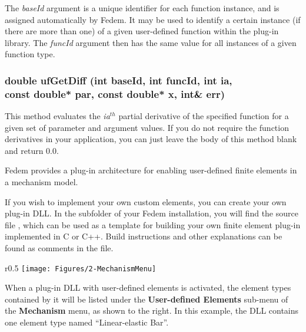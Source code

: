 The {\sl baseId} argument is a unique identifier for each function instance,
and is assigned automatically by Fedem. It may be used to identify a certain
instance (if there are more than one) of a given user-defined function within
the plug-in library. The {\sl funcId} argument then has the same value for all
instances of a given function type.

\subsubsection{double ufGetDiff (int baseId, int funcId, int ia, \\
  const double* par, const double* x, int\& err)}

This method evaluates the {\sl ia}$^{th}$ partial derivative of the specified
function for a given set of parameter and argument values.
If you do not require the function derivatives in your application,
you can just leave the body of this method blank and return 0.0.




Fedem provides a plug-in architecture for enabling user-defined finite elements
in a mechanism model.

If you wish to implement your own custom elements, you can create your own
plug-in DLL. In the  subfolder of your Fedem installation,
you will find the source file , which can be used as
a template for building your own finite element plug-in implemented in C or C++.
Build instructions and other explanations can be found as comments in the file.

\clearpage
\begin{wrapfigure}[9]{r}{0.5\textwidth}
  \texttt{[image: Figures/2-MechanismMenu]}
\end{wrapfigure}

When a plug-in DLL with user-defined elements is activated, the element
types contained by it will be listed under the
\textbf{User-defined Elements} sub-menu of the \textbf{Mechanism} menu,
as shown to the right. In this example, the DLL contains one element type
named ``Linear-elastic Bar''.

